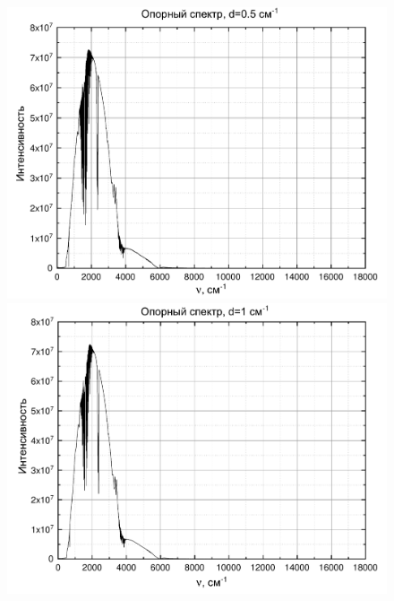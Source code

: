 \begin{figure}[h]
	\begin{minipage}[h]{0.5\linewidth}
		\centering
		\includegraphics[width=1\linewidth]{data/opor_0_5}
	\end{minipage}
	\begin{minipage}[h!]{0.5\linewidth}
		\centering
		\includegraphics[width=1\linewidth]{data/opor_1}
	\end{minipage}
	\begin{minipage}[h!]{0.5\linewidth}
		\centering

\end{minipage}
\end{figure}
